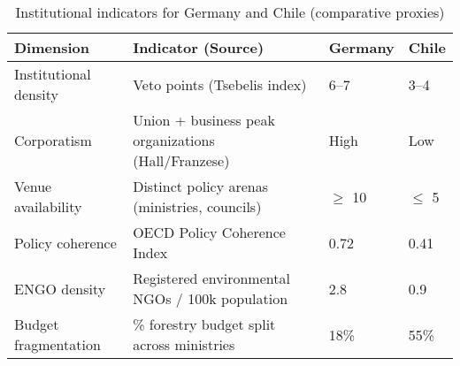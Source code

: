 \begin{table}[h!]
\centering
\caption{Institutional indicators for Germany and Chile (comparative proxies)}
\label{tab:indicators}
\begin{tabular}{@{}p{4cm}p{4cm}p{3cm}p{3cm}@{}}
\toprule
\textbf{Dimension} & \textbf{Indicator (Source)} & \textbf{Germany} & \textbf{Chile} \\ \midrule
Institutional density & Veto points (Tsebelis index) & 6--7 & 3--4 \\
Corporatism & Union + business peak organizations (Hall/Franzese) & High & Low \\
Venue availability & Distinct policy arenas (ministries, councils) & $\geq$ 10 & $\leq$ 5 \\
Policy coherence & OECD Policy Coherence Index & 0.72 & 0.41 \\
ENGO density & Registered environmental NGOs / 100k population & 2.8 & 0.9 \\
Budget fragmentation & \% forestry budget split across ministries & 18\% & 55\% \\ \bottomrule
\end{tabular}
\end{table}